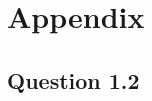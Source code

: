\documentclass{article}
\begin{document}
\newpage
\appendix

\section{Appendix}
\subsection{Question 1.2}\label{appendix:code.1.2}

\end{document}
